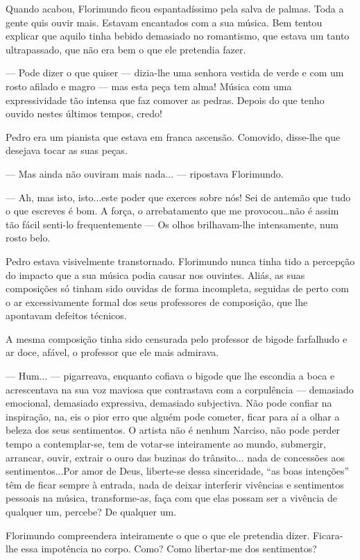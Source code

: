 Quando acabou, Florimundo ficou espantadíssimo pela salva de palmas.
Toda a gente quis ouvir mais. Estavam encantados com a sua música. Bem
tentou explicar que aquilo tinha bebido demasiado no romantismo, que
estava um tanto ultrapassado, que não era bem o que ele pretendia fazer.

--- Pode dizer o que quiser --- dizia-lhe uma senhora vestida de verde e com
um rosto afilado e magro --- mas esta peça tem alma! Música com uma
expressividade tão intensa que faz comover as pedras. Depois do que
tenho ouvido nestes últimos tempos, credo!

Pedro era um pianista que estava em franca ascensão. Comovido, disse-lhe
que desejava tocar as suas peças.

--- Mas ainda não ouviram mais nada... --- ripostava Florimundo.

--- Ah, mas isto, isto...este poder que exerces sobre nós! Sei de antemão
que tudo o que escreves é bom. A força, o arrebatamento que me
provocou\ldots{}não é assim tão fácil senti-lo frequentemente --- Os olhos
brilhavam-lhe intensamente, num rosto belo.

Pedro estava visivelmente transtornado. Florimundo nunca tinha tido a
percepção do impacto que a sua música podia causar nos ouvintes. Aliás,
as suas composições só tinham sido ouvidas de forma incompleta, seguidas
de perto com o ar excessivamente formal dos seus professores de
composição, que lhe apontavam defeitos técnicos.

A mesma composição tinha sido censurada pelo professor de bigode
farfalhudo e ar doce, afável, o professor que ele mais admirava.

--- Hum... --- pigarreava, enquanto cofiava o bigode que lhe escondia a boca
e acrescentava na sua voz maviosa que contrastava com a corpulência ---
demasiado emocional, demasiado expressiva, demasiado subjectiva. Não
pode confiar na inspiração, na, eis o pior erro que alguém pode cometer,
ficar para aí a olhar a beleza dos seus sentimentos. O artista não é
nenhum Narciso, não pode perder tempo a contemplar-se, tem de votar-se
inteiramente ao mundo, submergir, arrancar, ouvir, extrair o ouro das
buzinas do trânsito... nada de concessões aos sentimentos...Por amor de
Deus, liberte-se dessa sinceridade, ``as boas intenções'' têm de ficar
sempre à entrada, nada de deixar interferir vivências e sentimentos
pessoais na música, transforme-as, faça com que elas possam ser a
vivência de qualquer um, percebe? De qualquer um.

Florimundo compreendera inteiramente o que o que ele pretendia dizer.
Ficara-lhe essa impotência no corpo. Como? Como libertar-me dos
sentimentos?


